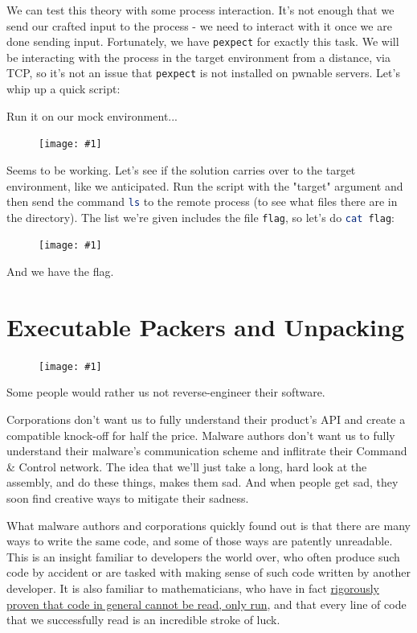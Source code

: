 \documentclass{article}
\newcommand{\displayimage}[1] {
\begin{figure}[H]
    \centering
    \texttt{[image: \#1]} 
\end{figure}
}
\newcommand{\wrapimageright}[1] {
    \begin{figure}
        \begin{center}
            \texttt{[image: \#1]} 
        \end{center}
    \end{figure}
}
\newcommand{\xcode}[2]{\colorbox{ubuntuback}{\lstinline[language=#1]|#2|}}
\begin{document}
        We can test this theory with some process interaction. It's not enough that we send our crafted input to the process - we need to interact with it once we are done sending input. Fortunately, we have \xcode{python}{pexpect} for exactly this task. We will be interacting with the process in the target environment from a distance, via TCP, so it's not an issue that \xcode{python}{pexpect} is not installed on pwnable servers. Let's whip up a quick script:



Run it on our mock environment...

\displayimage{./exercises/02_bof/local_test_2.png}

Seems to be working. Let's see if the solution carries over to the target environment, like we anticipated. Run the script with the "target" argument and then send the command \xcode{bash}{ls} to the remote process (to see what files there are in the directory). The list we're given includes the file \xcode{bash}{flag}, so let's do \xcode{bash}{cat flag}:

\displayimage{./exercises/02_bof/remote_test.png}

And we have the flag.

\section{Executable Packers and Unpacking}

\wrapimageright{./images/packed.jpg}
Some people would rather us not reverse-engineer their software. 

Corporations don't want us to fully understand their product's API and create a compatible knock-off for half the price. Malware authors don't want us to fully understand their malware's communication scheme and inflitrate their Command \& Control network. The idea that we'll just take a long, hard look at the assembly, and do these things, makes them sad. And when people get sad, they soon find creative ways to mitigate their sadness.

What malware authors and corporations quickly found out is that there are many ways to write the same code, and some of those ways are patently unreadable. This is an insight familiar to developers the world over, who often produce such code by accident or are tasked with making sense of such code written by another developer. It is also familiar to mathematicians, who have in fact \href{http://www.lel.ed.ac.uk/~gpullum/loopsnoop.html}{rigorously proven that code in general cannot be read, only run}, and that every line of code that we successfully read is an incredible stroke of luck. 
\end{document}
